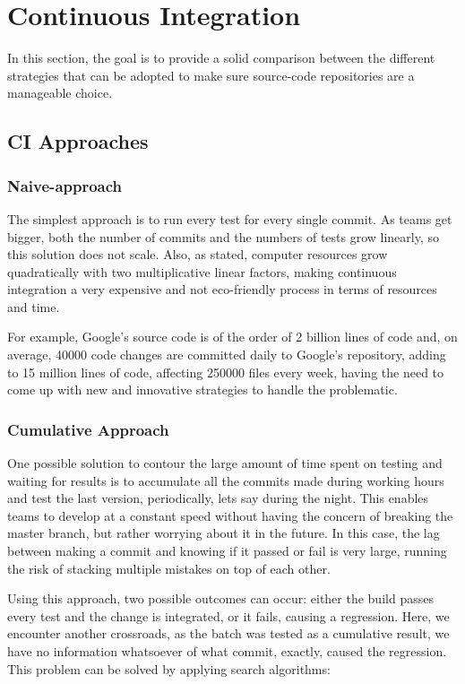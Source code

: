 \section{Continuous Integration}

In this section, the goal is to provide a solid comparison between the different strategies that can be adopted to make sure source-code repositories are a manageable choice.


\subsection{CI Approaches}

\subsubsection{Naive-approach}

The simplest approach is to run every test for every single commit. As teams get bigger,  both the number of commits and the numbers of tests grow linearly, so this solution does not scale. Also, as \cite{Memon:2017:TGC:3103112.3103143} stated, computer resources grow quadratically with two multiplicative linear factors, making continuous integration a very expensive and not eco-friendly process in terms of resources and time.
\par For example, Google's source code is of the order of 2 billion lines of code and, on average, 40000 code changes are committed daily to Google's repository, adding to 15 million lines of code, affecting 250000 files every week, having the need to come up with new and innovative strategies to handle the problematic.\cite{Ziftci}



\subsubsection{Cumulative Approach}

One possible solution to contour the large amount of time spent on testing and waiting for results is to accumulate all the commits made during working hours and test the last version, periodically, lets say during the night. This enables teams to develop at a constant speed without having the concern of breaking the master branch, but rather worrying about it in the future. In this case, the lag between making a commit and knowing if it passed or fail is very large, running the risk of stacking multiple mistakes on top of each other. 
\par Using this approach, two possible outcomes can occur: either the build passes every test and the change is integrated, or it fails, causing a regression. Here, we encounter another crossroads, as the batch was tested as a cumulative result, we have no information whatsoever of what commit, exactly, caused the regression. This problem can be solved by applying search algorithms:

